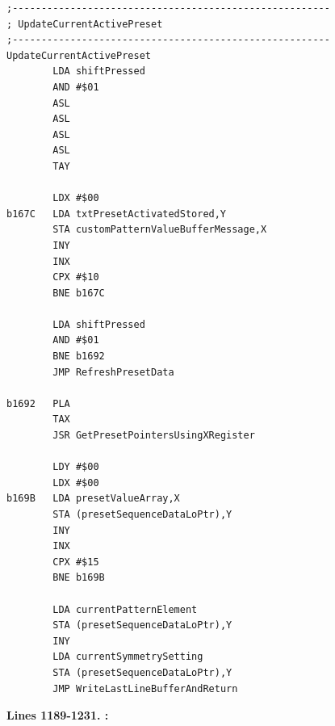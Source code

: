 \clearpage
\begin{lstlisting}
;-------------------------------------------------------
; UpdateCurrentActivePreset
;-------------------------------------------------------
UpdateCurrentActivePreset    
        LDA shiftPressed
        AND #$01
        ASL 
        ASL 
        ASL 
        ASL 
        TAY 

        LDX #$00
b167C   LDA txtPresetActivatedStored,Y
        STA customPatternValueBufferMessage,X
        INY 
        INX 
        CPX #$10
        BNE b167C

        LDA shiftPressed
        AND #$01
        BNE b1692
        JMP RefreshPresetData

b1692   PLA 
        TAX 
        JSR GetPresetPointersUsingXRegister

        LDY #$00
        LDX #$00
b169B   LDA presetValueArray,X
        STA (presetSequenceDataLoPtr),Y
        INY 
        INX 
        CPX #$15
        BNE b169B

        LDA currentPatternElement
        STA (presetSequenceDataLoPtr),Y
        INY 
        LDA currentSymmetrySetting
        STA (presetSequenceDataLoPtr),Y
        JMP WriteLastLineBufferAndReturn
\end{lstlisting}
\clearpage

\textbf{Lines 1189-1231. :} 
\clearpage

